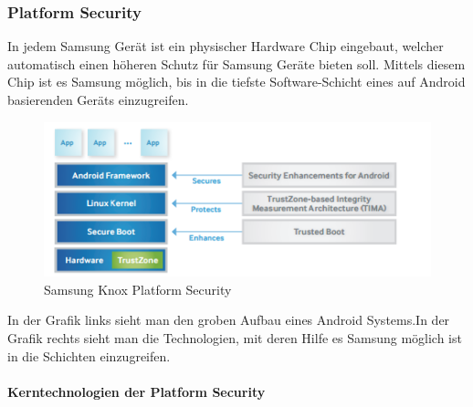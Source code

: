 \subsubsection{Platform Security}
In jedem Samsung Gerät ist ein physischer Hardware Chip eingebaut, welcher automatisch einen höheren Schutz für Samsung Geräte bieten soll. Mittels diesem Chip ist es Samsung möglich, bis in die tiefste Software-Schicht eines auf Android basierenden Geräts einzugreifen.
\begin{figure}[H]
\centering
\includegraphics[scale=0.9]{Images/samsung_knox_platform_security}
\caption{Samsung Knox Platform Security}
\end{figure}
In der Grafik links sieht man den groben Aufbau eines Android Systems.In der Grafik rechts sieht man die Technologien, mit deren Hilfe es Samsung möglich ist in die Schichten einzugreifen.
\paragraph{Kerntechnologien der Platform Security}


